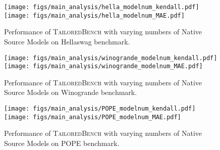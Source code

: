 \begin{figure*}[ht]
  \texttt{[image: figs/main\_analysis/hella\_modelnum\_kendall.pdf]} \hfill
  \texttt{[image: figs/main\_analysis/hella\_modelnum\_MAE.pdf]}
  \caption {Performance of \textsc{TailoredBench} with varying numbers of Native Source Models on Hellaswag benchmark.}
\vspace{-0.3cm}
\label{mainanalysis_hella}
\end{figure*}

\begin{figure*}[ht]
  \texttt{[image: figs/main\_analysis/winogrande\_modelnum\_kendall.pdf]} \hfill
  \texttt{[image: figs/main\_analysis/winogrande\_modelnum\_MAE.pdf]}
  \caption {Performance of \textsc{TailoredBench} with varying numbers of Native Source Models on Winogrande benchmark.}
\vspace{-0.3cm}
\label{mainanalysis_winogrande}
\end{figure*}

\begin{figure*}[ht]
  \texttt{[image: figs/main\_analysis/POPE\_modelnum\_kendall.pdf]} \hfill
  \texttt{[image: figs/main\_analysis/POPE\_modelnum\_MAE.pdf]}
  \caption {Performance of \textsc{TailoredBench} with varying numbers of Native Source Models on POPE benchmark.}
\vspace{-0.3cm}
\label{mainanalysis_pope}
\end{figure*}